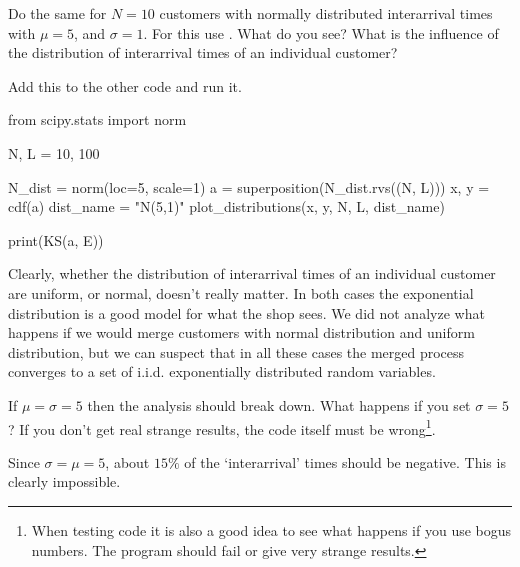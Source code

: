 \documentclass{scrartcl}
\begin{document}
\begin{exercise}
Do the same for $N=10$ customers with normally distributed interarrival times with $\mu=5$, and $\sigma =1$.
For this use . What do you see? What is the influence of the distribution of interarrival times of an individual customer? 
\begin{solution}
Add this to the other code and run it. 
\begin{pyverbatim}
from scipy.stats import norm

N, L = 10, 100

N_dist = norm(loc=5, scale=1)
a = superposition(N_dist.rvs((N, L)))
x, y = cdf(a)
dist_name = "N(5,1)"
plot_distributions(x, y, N, L, dist_name)

print(KS(a, E))
\end{pyverbatim}

Clearly, whether the distribution of interarrival times of an individual customer are uniform, or normal, doesn't really matter. In both cases the exponential distribution is a good model for what the shop sees. We did not analyze what happens if we would merge customers with normal distribution and uniform distribution, but we can suspect that in all these cases the merged process converges to a set of i.i.d. exponentially distributed random variables.

\end{solution}
\end{exercise}

\begin{exercise}
If  $\mu=\sigma=5$ then the analysis should break down. What happens if you set $\sigma=5$? If you don't get real strange results, the code itself must be wrong\footnote{When testing code it is also a good idea to see what happens if you use bogus numbers. The program should fail or give very strange results.}.
\begin{solution}
  Since $\sigma=\mu=5$, about $15\%$ of the `interarrival' times should be negative. This is clearly impossible. 
\end{solution}	
\end{exercise}
\end{document}
